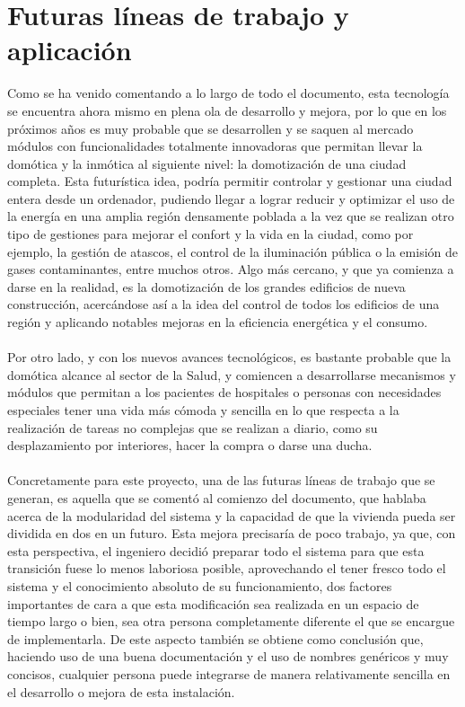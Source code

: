 \section{Futuras líneas de trabajo y aplicación}

Como se ha venido comentando a lo largo de todo el documento, esta tecnología se encuentra ahora mismo en plena ola de desarrollo y mejora, por lo que en los próximos años es muy probable que se desarrollen y se saquen al mercado módulos con funcionalidades totalmente innovadoras que permitan  llevar la domótica y la inmótica al siguiente nivel: la domotización de una ciudad completa. Esta futurística idea, podría permitir controlar y gestionar una ciudad entera desde un ordenador, pudiendo llegar a lograr reducir y optimizar el uso de la energía en una amplia región densamente poblada a la vez que se realizan otro tipo de gestiones para mejorar el confort y la vida en la ciudad, como por ejemplo, la gestión de atascos, el control de la iluminación pública o la emisión de gases contaminantes, entre muchos otros. Algo más cercano, y que ya comienza a darse en la realidad, es la domotización de los grandes edificios de nueva construcción, acercándose así a la idea del control de todos los edificios de una región  y aplicando notables mejoras en la eficiencia energética y el consumo. \\\\
Por otro lado, y con los nuevos avances tecnológicos, es bastante probable que la domótica alcance al sector de la Salud, y comiencen a desarrollarse mecanismos y módulos que permitan a los pacientes de hospitales o personas con necesidades especiales tener una vida más cómoda y  sencilla en lo que respecta a la realización de tareas no complejas que se realizan a diario, como su desplazamiento por interiores, hacer la compra o darse una ducha.\\\\
Concretamente para este proyecto, una de las futuras líneas de trabajo que se generan, es aquella que se comentó al comienzo del documento, que hablaba acerca de la modularidad del sistema y la capacidad de que la vivienda pueda ser dividida en dos en un futuro. Esta mejora precisaría de poco trabajo, ya que, con esta perspectiva, el ingeniero decidió preparar todo el sistema para que esta transición fuese lo menos laboriosa posible, aprovechando el tener fresco todo el sistema y el conocimiento absoluto de su funcionamiento, dos factores importantes de cara a que esta modificación sea realizada en un espacio de tiempo largo o bien, sea otra persona completamente diferente el que se encargue de implementarla. De este aspecto también se obtiene como conclusión que, haciendo uso de una buena documentación y el uso de nombres genéricos y muy concisos, cualquier persona puede integrarse de manera relativamente sencilla en el desarrollo o mejora de esta instalación.
